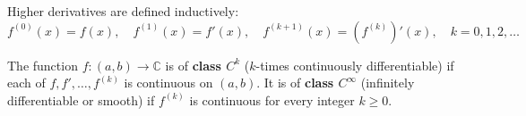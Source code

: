 Higher derivatives are defined inductively:
$$f^{(0)}(x) = f(x), \quad f^{(1)}(x) = f'(x), \quad f^{(k+1)}(x) = (f^{(k)})'(x), \quad k = 0, 1, 2, \ldots$$

The function $f: (a, b) \to \mathbb{C}$ is of \textbf{class $C^k$} ($k$-times continuously differentiable) if each of $f, f', \ldots, f^{(k)}$ is continuous on $(a, b)$. It is of \textbf{class $C^\infty$} (infinitely differentiable or smooth) if $f^{(k)}$ is continuous for every integer $k \geq 0$.
